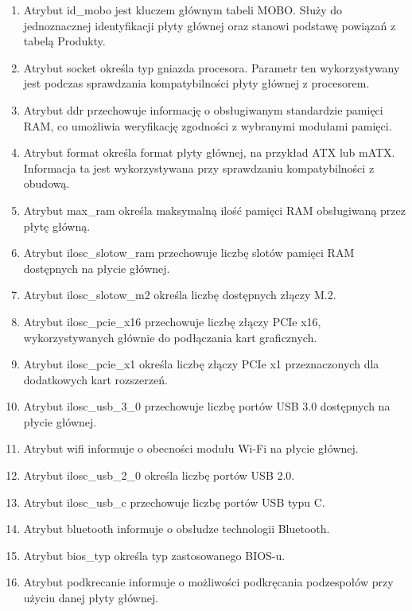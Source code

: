 \documentclass[a4paper,twoside,12pt]{book}
\begin{document}
\begin{enumerate}
    \item Atrybut id\_mobo jest kluczem głównym tabeli MOBO. Służy do jednoznacznej
    identyfikacji płyty głównej oraz stanowi podstawę powiązań z tabelą Produkty.

    \item Atrybut socket określa typ gniazda procesora. Parametr ten wykorzystywany
    jest podczas sprawdzania kompatybilności płyty głównej z procesorem.

    \item Atrybut ddr przechowuje informację o obsługiwanym standardzie pamięci RAM,
    co umożliwia weryfikację zgodności z wybranymi modułami pamięci.

    \item Atrybut format określa format płyty głównej, na przykład ATX lub mATX.
    Informacja ta jest wykorzystywana przy sprawdzaniu kompatybilności z obudową.

    \item Atrybut max\_ram określa maksymalną ilość pamięci RAM obsługiwaną przez
    płytę główną.

    \item Atrybut ilosc\_slotow\_ram przechowuje liczbę slotów pamięci RAM dostępnych
    na płycie głównej.

    \item Atrybut ilosc\_slotow\_m2 określa liczbę dostępnych złączy M.2.

    \item Atrybut ilosc\_pcie\_x16 przechowuje liczbę złączy PCIe x16, wykorzystywanych
    głównie do podłączania kart graficznych.

    \item Atrybut ilosc\_pcie\_x1 określa liczbę złączy PCIe x1 przeznaczonych dla
    dodatkowych kart rozszerzeń.

    \item Atrybut ilosc\_usb\_3\_0 przechowuje liczbę portów USB 3.0 dostępnych na
    płycie głównej.

    \item Atrybut wifi informuje o obecności modułu Wi-Fi na płycie głównej.

    \item Atrybut ilosc\_usb\_2\_0 określa liczbę portów USB 2.0.

    \item Atrybut ilosc\_usb\_c przechowuje liczbę portów USB typu C.

    \item Atrybut bluetooth informuje o obsłudze technologii Bluetooth.

    \item Atrybut bios\_typ określa typ zastosowanego BIOS-u.

    \item Atrybut podkrecanie informuje o możliwości podkręcania podzespołów przy
    użyciu danej płyty głównej.
\end{enumerate}
\end{document}
